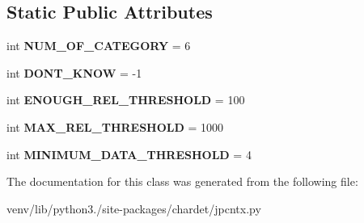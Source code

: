 \subsection*{Static Public Attributes}
\begin{DoxyCompactItemize}
\item 
\mbox{\label{classchardet_1_1jpcntx_1_1_japanese_context_analysis_aa08a4ea5ea1920eb7562b52d4c079993}} 
int {\bfseries N\+U\+M\+\_\+\+O\+F\+\_\+\+C\+A\+T\+E\+G\+O\+RY} = 6
\item 
\mbox{\label{classchardet_1_1jpcntx_1_1_japanese_context_analysis_a4983e92c8262daac3b3349944835e356}} 
int {\bfseries D\+O\+N\+T\+\_\+\+K\+N\+OW} = -\/1
\item 
\mbox{\label{classchardet_1_1jpcntx_1_1_japanese_context_analysis_a623ce0944bff8af55b5d228e58d2a421}} 
int {\bfseries E\+N\+O\+U\+G\+H\+\_\+\+R\+E\+L\+\_\+\+T\+H\+R\+E\+S\+H\+O\+LD} = 100
\item 
\mbox{\label{classchardet_1_1jpcntx_1_1_japanese_context_analysis_a8344429804fab010b039920a73d00f04}} 
int {\bfseries M\+A\+X\+\_\+\+R\+E\+L\+\_\+\+T\+H\+R\+E\+S\+H\+O\+LD} = 1000
\item 
\mbox{\label{classchardet_1_1jpcntx_1_1_japanese_context_analysis_ae44ac4414771b75f5d71aa0db7b561af}} 
int {\bfseries M\+I\+N\+I\+M\+U\+M\+\_\+\+D\+A\+T\+A\+\_\+\+T\+H\+R\+E\+S\+H\+O\+LD} = 4
\end{DoxyCompactItemize}


The documentation for this class was generated from the following file\+:\begin{DoxyCompactItemize}
\item 
venv/lib/python3./site-\/packages/chardet/jpcntx.\+py\end{DoxyCompactItemize}
